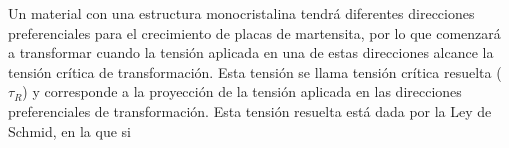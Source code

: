 \documentclass[a4paper,12pt,fleqn,twoside,openany]{book}
\begin{document}
Un material con una estructura monocristalina tendrá diferentes direcciones preferenciales para el crecimiento de placas de martensita, por lo que comenzará a transformar cuando la tensión aplicada en una de estas direcciones alcance la tensión crítica de transformación. Esta tensión se llama tensión crítica resuelta ($\tau_{R}$) y corresponde a la proyección de la tensión aplicada en las direcciones preferenciales de transformación. Esta tensión resuelta está dada por la Ley de Schmid, en la que si
%
\end{document}
